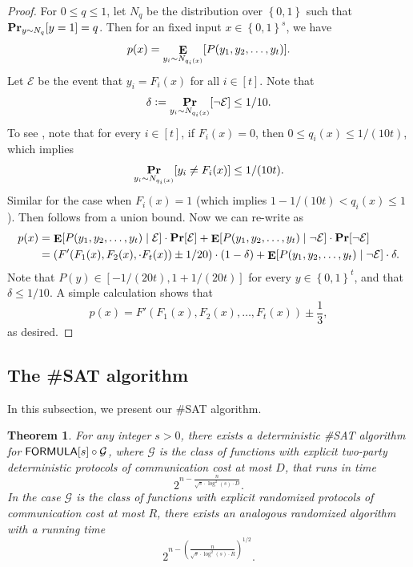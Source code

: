 \documentclass[10pt,a4paper]{article}
\newtheorem{theorem}{Theorem}
\DeclareMathOperator*\Exp{{\bf E}}
\DeclareMathOperator*\Prob{{\bf Pr}}
\newcommand{\bool}{\left\{0,1\right\}}
\newcommand{\FORMULA}{{\sf FORMULA}}
\begin{document}
\begin{proof}
	    For $0\leq q\leq 1$, let $N_q$ be the distribution over $\bool$ such that $\Prob_{y\sim N_q}[y=1]=q$. Then for an fixed input $x\in\bool^s$, we have
	    \begin{equation}\label{sat-bb1}
	        p(x)=\Exp_{y_i\sim N_{q_i(x)}}[P(y_1,y_2,\dots,y_t)].
	    \end{equation}
        Let $\mathcal{E}$ be the event that $y_i=F_i(x)$ for all $i\in[t]$. Note that
        \begin{equation}\label{sat-bb2}
            \delta \vcentcolon=\Prob_{y_i\sim N_{q_i(x)}}[\neg \mathcal{E}]\leq 1/10.
        \end{equation}
        To see , note that for every $i\in[t]$, if $F_i(x)=0$, then $0\leq q_i(x)\leq 1/(10t)$, which implies
        \[
            \Prob_{y_i\sim N_{q_i(x)}}[y_i\neq F_i(x)]\leq 1/(10t).
        \]
        Similar for the case when $F_i(x)=1$ (which implies $1-1/(10t)< q_i(x)\leq 1$). Then  follows from a union bound. Now we can re-write  as
        \begin{align*}
            p(x) &= \Exp[P(y_1,y_2,\dots,y_t)\mid \mathcal{E}]\cdot \Prob[\mathcal{E}] + \Exp[P(y_1,y_2,\dots,y_t)\mid \neg\mathcal{E}]\cdot \Prob[\neg\mathcal{E}]\\
            &=\left(F'(F_1(x),F_2(x),\cdot F_t(x))\pm 1/20 \right)\cdot(1-\delta)+ \Exp[P(y_1,y_2,\dots,y_t)\mid \neg\mathcal{E}]\cdot\delta.
        \end{align*}
        Note that $P(y)\in[-1/(20t),1+1/(20t)]$ for every $y\in\bool^t$, and that $\delta \leq 1/10$. A simple calculation shows that
        \[
               p(x) = F'(F_1(x),F_2(x),\dots, F_t(x))\pm \frac{1}{3},
        \]
        as desired.
	\end{proof}
    
%
    
%

%

%
%
%
%
%
%

	\subsection{The \#SAT algorithm}
	
	In this subsection, we present our \#SAT algorithm.
	
	\begin{theorem}\label{thm:sat-main}
	    For any integer $s>0$, there exists a deterministic \#SAT algorithm for $\FORMULA[s]\circ\mathcal{G}$, where $\mathcal{G}$ is the class of functions with explicit two-party deterministic protocols of communication cost at most $D$, that runs in time 
		\[
	        2^{n-\frac{n}{\sqrt{s}\cdot\log^2(s)\cdot D}}.
		\]
		In the case $\mathcal{G}$ is the class of functions with explicit randomized protocols of communication cost at most $R$, there exists an analogous randomized algorithm with a running time
		\[
	        2^{n-\left(\frac{n}{\sqrt{s}\cdot\log^2(s)\cdot R}\right)^{1/2}}.
	    \]
	\end{theorem}
	
\end{document}
